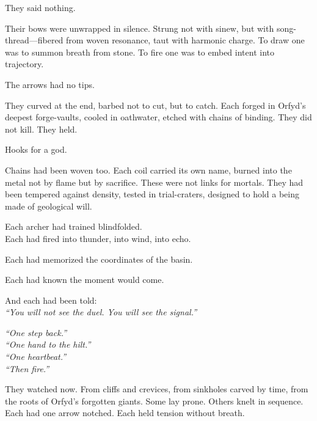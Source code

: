 \documentclass[12pt]{article}
\begin{document}
\vspace{0.5em}
They said nothing.

\vspace{0.5em}
Their bows were unwrapped in silence. Strung not with sinew, but with song-thread---fibered from woven resonance, taut with harmonic charge. To draw one was to summon breath from stone. To fire one was to embed intent into trajectory.

\vspace{0.5em}
The arrows had no tips.

\vspace{0.5em}
They curved at the end, barbed not to cut, but to catch. Each forged in Orfyd’s deepest forge-vaults, cooled in oathwater, etched with chains of binding. They did not kill. They held.

\vspace{0.5em}
Hooks for a god.

\vspace{0.5em}
Chains had been woven too. Each coil carried its own name, burned into the metal not by flame but by sacrifice. These were not links for mortals. They had been tempered against density, tested in trial-craters, designed to hold a being made of geological will.

\vspace{0.5em}
Each archer had trained blindfolded.\\
Each had fired into thunder, into wind, into echo.

\vspace{0.5em}
Each had memorized the coordinates of the basin.

\vspace{0.5em}
Each had known the moment would come.

\vspace{0.5em}
And each had been told:\\
\textit{``You will not see the duel. You will see the signal.''}

\vspace{0.5em}
\textit{``One step back.''}\\
\textit{``One hand to the hilt.''}\\
\textit{``One heartbeat.''}\\
\textit{``Then fire.''}

\vspace{0.5em}
They watched now. From cliffs and crevices, from sinkholes carved by time, from the roots of Orfyd’s forgotten giants. Some lay prone. Others knelt in sequence. Each had one arrow notched. Each held tension without breath.
\end{document}
